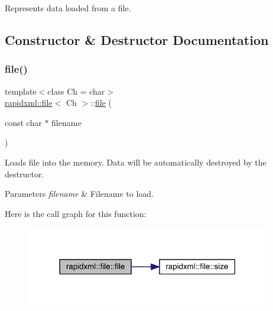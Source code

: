 Represents data loaded from a file. 

\subsection{Constructor \& Destructor Documentation}
\mbox{\label{classrapidxml_1_1file_ae881a3cab1fe7152d45c92a8d7606cb3}} 
\subsubsection{\texorpdfstring{file()}{file()}\hspace{0.1cm}{\footnotesize\ttfamily [1/2]}}
{\footnotesize\ttfamily template$<$class Ch  = char$>$ \\
\mbox{\hyperlink{classrapidxml_1_1file}{rapidxml\+::file}}$<$ Ch $>$\+::\mbox{\hyperlink{classrapidxml_1_1file}{file}} (\begin{DoxyParamCaption}\item[{const char $\ast$}]{filename }\end{DoxyParamCaption})\hspace{0.3cm}{\ttfamily [inline]}}

Loads file into the memory. Data will be automatically destroyed by the destructor.
\begin{DoxyParams}{Parameters}
{\em filename} & Filename to load. \\
\hline
\end{DoxyParams}
Here is the call graph for this function\+:\nopagebreak
\begin{figure}[H]
\begin{center}
\leavevmode
\includegraphics[width=302pt]{classrapidxml_1_1file_ae881a3cab1fe7152d45c92a8d7606cb3_cgraph}
\end{center}
\end{figure}
\mbox{\label{classrapidxml_1_1file_a90707ccd991cc392dcf4bef37eed9d1f}} 
